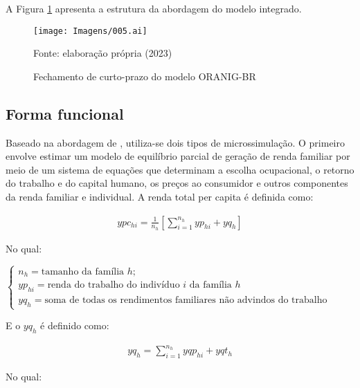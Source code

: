 A Figura \ref{fig:microssimulacao} apresenta a estrutura da abordagem do modelo integrado.

\begin{landscape}
	\begin{figure}
		\centering
		\texttt{[image: Imagens/005.ai]}
		\caption{Fechamento de curto-prazo do modelo ORANIG-BR}
		\label{fig:microssimulacao}
		\footnotesize
		Fonte: elaboração própria (2023)
	\end{figure}
\end{landscape}

\subsection{Forma funcional} \label{subsec:forma_funcional}
 
Baseado na abordagem de \textcite{ganuza07}, utiliza-se dois tipos de microssimulação. O primeiro envolve estimar um modelo de equilíbrio parcial de geração de renda familiar por meio de um sistema de equações que determinam a escolha ocupacional, o retorno do trabalho e do capital humano, os preços ao consumidor e outros componentes da renda familiar e individual. A renda total per capita é definida como:

\begin{align}
	ypc_{hi} = \frac{1}{n_h} \left[ \sum_{i = 1}^{n_h} yp_{hi} + yq_h \right] \label{eq:renda}
\end{align}

No qual:

\vspace{0.5cm}

$
\begin{cases}
	n_h     = \text{tamanho da família $h$;} \\
	yp_{hi} = \text{renda do trabalho do indivíduo $i$ da família $h$} \\
	yq_h    = \text{soma de todas os rendimentos familiares não advindos do trabalho}
\end{cases}
$

\vspace{0.5cm}

E o $yq_h$ é definido como:

\begin{align}
	yq_h = \sum_{i = 1}^{n_h} yqp_{hi} + yqt_h 
\end{align}

No qual:

\vspace{0.5cm}

